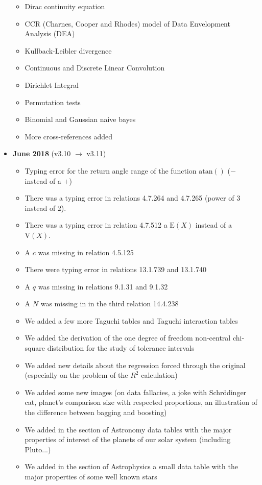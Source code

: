 \documentclass[12pt,a4paper,twoside,openright]{report}
\theoremstyle{definition}
\theoremstyle{itexmp}
\numberwithin{equation}{section}
\begin{document}
\begin{itemize}
\begin{itemize}[noitemsep]
			\item Dirac continuity equation
			\item CCR (Charnes, Cooper and Rhodes) model of Data Envelopment Analysis (DEA)
			\item Kullback-Leibler divergence
			\item Continuous and Discrete Linear Convolution
			\item Dirichlet Integral
			\item Permutation tests
			\item Binomial and Gaussian naive bayes
			\item More cross-references added
		\end{itemize}
	\item \textbf{June 2018} (v3.10 $\rightarrow$ v3.11)
		\begin{itemize}[noitemsep]
			\item Typing error for the return angle range of the function $\mathrm{atan()}$ ($-$ instead of a $+$)
			\item There was a typing error in relations 4.7.264 and 4.7.265 (power of $3$ instead of $2$).
			\item There was a typing error in relation 4.7.512 a $\text{E}(X)$ instead of a $\text{V}(X)$.
			\item A $c$ was missing in relation 4.5.125
			\item There were typing error in relations 13.1.739 and 13.1.740
			\item A $q$ was missing in relations 9.1.31 and 9.1.32
			\item A $N$ was missing in in the third relation 14.4.238
			\item We added a few more Taguchi tables and Taguchi interaction tables
			\item We added the derivation of the one degree of freedom non-central chi-square distribution for the study of tolerance intervals
			\item We added new details about the regression forced through the original (especially on the problem of the $R^2$ calculation)
			\item We added some new images (on data fallacies, a joke with Schrödinger cat, planet's comparison size with respected proportions, an illustration of the difference between bagging and boosting)
			\item We added in the section of Astronomy data tables with the major properties of interest of the planets of our solar system (including Pluto...)
			\item We added in the section of Astrophysics a small data table with the major properties of some well known stars

\end{itemize}
\end{itemize}
\end{document}
